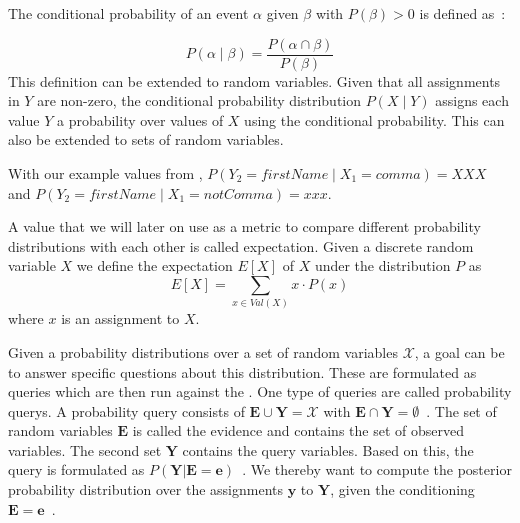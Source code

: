\bigskip

The \gls{conditional probability} of an event $\alpha$ given $\beta$ with $P(\beta)>0$ is defined as~\cite{koller2009probabilistic}:

\begin{equation}
\label{equ:conditional-probability}
P(\alpha\mid\beta) = \frac{P(\alpha\cap\beta)}{P(\beta)}
\end{equation}
This definition can be extended to \glspl{random variable}.
Given that all assignments in $Y$ are non-zero, the \gls{conditional probability distribution} $P(X\mid Y)$ assigns each value $Y$ a probability over values of $X$ using the \gls{conditional probability}.
This can also be extended to sets of \glspl{random variable}.

With our example values from , $P(Y_2{=}firstName\mid X_1{=}comma)=XXX$ and $P(Y_2{=}firstName\mid X_1{=}notComma)=xxx$.

\bigskip

A value that we will later on use as a metric to compare different \glspl{probability distribution} with each other is called \gls{expectation}.
Given a discrete \gls{random variable} $X$ we define the expectation $E[X]$ of $X$ under the distribution $P$ as~\cite{koller2009probabilistic}
\begin{equation}
  \label{equ:expectation-x}
  E[X]=\sum_{x\in Val(X)} x\cdot P(x)
\end{equation}
where $x$ is an assignment to $X$.

\bigskip

Given a \glspl{probability distribution} over a set of \glspl{random variable} $\mathcal{X}$, a goal can be to answer specific questions about this distribution.
These are formulated as queries which are then run against the .
One type of queries are called \glspl{probability query}.
A \gls{probability query} consists of $\mathbf{E}\cup\mathbf{Y}=\mathcal{X}$ with $\mathbf{E}\cap\mathbf{Y}=\emptyset$~\citep{koller2009probabilistic}.
The set of \glspl{random variable} $\mathbf{E}$ is called the \gls{evidence} and contains the set of observed variables.
The second set $\mathbf{Y}$ contains the query variables.
Based on this, the query is formulated as $P(\mathbf{Y}|\mathbf{E}=\mathbf{e})$~\citep{koller2009probabilistic}.
We thereby want to compute the posterior \gls{probability distribution} over the assignments $\mathbf{y}$ to $\mathbf{Y}$, given the conditioning $\mathbf{E}=\mathbf{e}$~\citep{koller2009probabilistic}.

